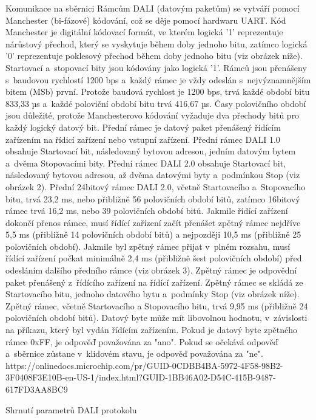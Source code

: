 \sec Komunikace na sběrnici
Rámcům DALI (datovým paketům) se vytváří pomocí Manchester (bi-fázové) kódování, což se děje pomocí hardwaru UART.
Kód Manchester je digitální kódovací formát, ve kterém logická '1' reprezentuje nárůstový přechod,
který se vyskytuje během doby jednoho bitu, zatímco logická '0' reprezentuje poklesový přechod během
doby jednoho bitu (viz obrázek níže). Startovací a~stopovací bity jsou kódovány jako logická '1'.
\medskip
Rámců jsou přenášeny s~baudovou rychlostí 1200 bps a~každý rámec je vždy odeslán s~nejvýznamnějším bitem (MSb) první.
Protože baudová rychlost je 1200 bps, trvá každé období bitu 833,33 µs a~každé poloviční období bitu trvá 416,67 µs.
Časy polovičního období jsou důležité, protože Manchesterovo kódování vyžaduje dva přechody bitů pro každý logický datový bit.
Přední rámec je datový paket přenášený řídícím zařízením na řídicí zařízení nebo vstupní zařízení.
Přední rámec DALI 1.0 obsahuje Startovací bit, následovaný bytovou adresou, jedním datovým bytem a~dvěma Stopovacími bity.
\medskip
Přední rámec DALI 2.0 obsahuje Startovací bit, následovaný bytovou adresou, až dvěma datovými byty a~podmínkou Stop (viz obrázek 2).
Přední 24bitový rámec DALI 2.0, včetně Startovacího a~Stopovacího bitu, trvá 23,2 ms, nebo přibližně 56 polovičních období bitů,
zatímco 16bitový rámec trvá 16,2 ms, nebo 39 polovičních období bitů. Jakmile řídící zařízení dokončí přenos rámce,
musí řídící zařízení začít přenášet zpětný rámec nejdříve 5,5 ms (přibližně 14 polovičních období bitů)
a nejpozději 10,5 ms (přibližně 25 polovičních období). Jakmile byl zpětný rámec přijat v~plném rozsahu,
musí řídící zařízení počkat minimálně 2,4 ms (přibližně šest polovičních období) před odesláním dalšího
předního rámce (viz obrázek 3).
Zpětný rámec je odpovědní paket přenášený z~řídícího zařízení na řídící zařízení. Zpětný rámec se skládá
ze Startovacího bitu, jednoho datového bytu a~podmínky Stop (viz obrázek níže). Zpětný rámec, včetně Startovacího a
Stopovacího bitu, trvá 9,95 ms (přibližně 24 polovičních období bitů). Datový byte může mít libovolnou hodnotu,
v~závislosti na příkazu, který byl vydán řídícím zařízením. Pokud je datový byte zpětného rámce 0xFF,
je odpověď považována za "ano". Pokud se očekává odpověď a~sběrnice zůstane v~klidovém stavu, je odpověď považována za "ne".
\medskip
https://onlinedocs.microchip.com/pr/GUID-0CDBB4BA-5972-4F58-98B2-3F0408F3E10B-en-US-1/index.html?GUID-1BB46A02-D54C-415B-9487-617FD3AA8BC9
\medskip

\sec Shrnutí parametrů DALI protokolu

